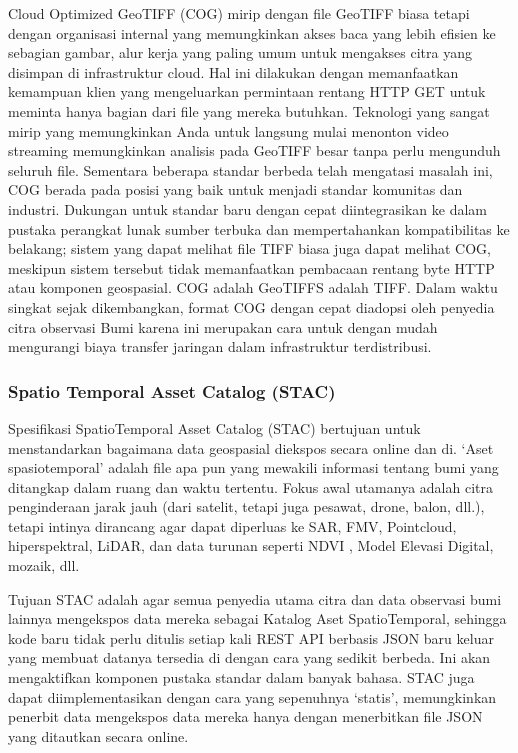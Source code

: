 \documentclass[letterpaper,10pt,english]{sphinxmanual}
\begin{document}
Cloud Optimized GeoTIFF (COG) mirip dengan file GeoTIFF biasa tetapi dengan organisasi internal yang memungkinkan akses baca yang lebih efisien ke sebagian gambar, alur kerja yang paling umum untuk mengakses citra yang disimpan di infrastruktur cloud. Hal ini dilakukan dengan memanfaatkan kemampuan klien yang mengeluarkan permintaan rentang HTTP GET untuk meminta hanya bagian dari file yang mereka butuhkan. Teknologi yang sangat mirip yang memungkinkan Anda untuk langsung mulai menonton video streaming memungkinkan analisis pada GeoTIFF besar tanpa perlu mengunduh seluruh file.
Sementara beberapa standar berbeda telah mengatasi masalah ini, COG berada pada posisi yang baik untuk menjadi standar komunitas dan industri. Dukungan untuk standar baru dengan cepat diintegrasikan ke dalam pustaka perangkat lunak sumber terbuka dan mempertahankan kompatibilitas ke belakang; sistem yang dapat melihat file TIFF biasa juga dapat melihat COG, meskipun sistem tersebut tidak memanfaatkan pembacaan rentang byte HTTP atau komponen geospasial. COG adalah GeoTIFFS adalah TIFF. Dalam waktu singkat sejak dikembangkan, format COG dengan cepat diadopsi oleh penyedia citra observasi Bumi karena ini merupakan cara untuk dengan mudah mengurangi biaya transfer jaringan dalam infrastruktur terdistribusi.


\subsubsection{Spatio Temporal Asset Catalog (STAC)}
\label{\detokenize{sesi3/interoperabilitas:spatio-temporal-asset-catalog-stac}}

Spesifikasi SpatioTemporal Asset Catalog (STAC) bertujuan untuk menstandarkan bagaimana data geospasial diekspos secara online dan di. ‘Aset spasiotemporal’ adalah file apa pun yang mewakili informasi tentang bumi yang ditangkap dalam ruang dan waktu tertentu. Fokus awal utamanya adalah citra penginderaan jarak jauh (dari satelit, tetapi juga pesawat, drone, balon, dll.), tetapi intinya dirancang agar dapat diperluas ke SAR, FMV, Point\sphinxhyphen{}cloud, hiperspektral, LiDAR, dan data turunan seperti NDVI , Model Elevasi Digital, mozaik, dll.

Tujuan STAC adalah agar semua penyedia utama citra dan data observasi bumi lainnya mengekspos data mereka sebagai Katalog Aset SpatioTemporal, sehingga kode baru tidak perlu ditulis setiap kali REST API berbasis JSON baru keluar yang membuat datanya tersedia di dengan cara yang sedikit berbeda. Ini akan mengaktifkan komponen pustaka standar dalam banyak bahasa. STAC juga dapat diimplementasikan dengan cara yang sepenuhnya ‘statis’, memungkinkan penerbit data mengekspos data mereka hanya dengan menerbitkan file JSON yang ditautkan secara online.
\end{document}
